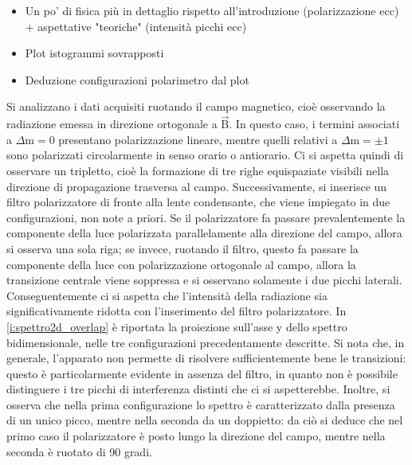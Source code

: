 \documentclass[twocolumn,10pt]{asme2ej}
\begin{document}
\begin{itemize}
    \item Un po' di fisica più in dettaglio rispetto all'introduzione (polarizzazione ecc) + aspettative "teoriche"
    (intensità picchi ecc)
    \item Plot istogrammi sovrapposti 
    \item Deduzione configurazioni polarimetro dal plot 
\end{itemize}
Si analizzano i dati acquisiti ruotando il campo magnetico, cioè osservando la radiazione emessa 
in direzione ortogonale a $\vec{\text{B}}$. In questo caso, i termini associati a $\Delta \text{m} = 0$ presentano polarizzazione lineare, 
mentre quelli relativi a $\Delta \text{m} = \pm 1$ sono polarizzati circolarmente in senso orario o antiorario. 
Ci si aspetta quindi di osservare un tripletto, cioè la formazione di tre righe equispaziate visibili nella direzione 
di propagazione trasversa al campo. Successivamente, si inserisce un filtro polarizzatore di fronte alla lente condensante, che viene impiegato in due configurazioni, non note a priori. 
Se il polarizzatore fa passare prevalentemente la componente della luce polarizzata parallelamente alla direzione del campo, allora si osserva una sola riga; se invece, ruotando il filtro, questo 
fa passare la componente della luce con polarizzazione ortogonale al campo, allora la transizione centrale viene soppressa e si osservano solamente i due picchi laterali.
Conseguentemente ci si aspetta che l'intensità della radiazione sia significativamente ridotta con l'inserimento del filtro polarizzatore.  
In \figurename\ref{i:spettro2d_overlap} è riportata la proiezione sull'asse y dello spettro bidimensionale, nelle tre configurazioni precedentamente descritte. 
Si nota che, in generale, l'apparato non permette di risolvere sufficientemente bene le transizioni: questo è particolarmente evidente in assenza del filtro, in quanto
non è possibile distinguere i tre picchi di interferenza distinti che ci si aspetterebbe. Inoltre, si osserva che nella prima configurazione lo spettro è caratterizzato dalla presenza di un unico
picco, mentre nella seconda da un doppietto: da ciò si deduce che nel primo caso il polarizzatore è posto lungo la direzione del campo, mentre nella seconda è ruotato di 90 gradi. 
\end{document}
